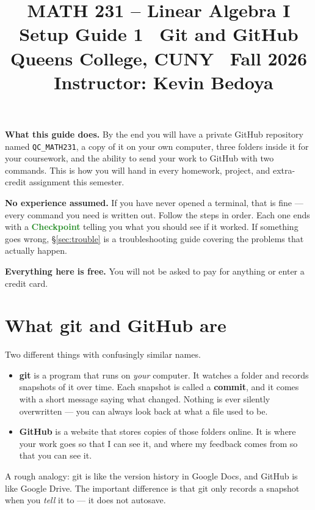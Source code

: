 \documentclass[11pt]{article}
\title{\vspace{-1.2cm}\textbf{\sffamily MATH 231 -- Linear Algebra I}\\[4pt]
       {\large\sffamily Setup Guide 1 \textbullet\ Git and GitHub}\\[2pt]
       {\normalsize\sffamily Queens College, CUNY \textbullet\ Fall 2026
        \textbullet\ Instructor: Kevin Bedoya}}
\author{}
\date{}
\newcommand{\repname}{QC\_MATH231}
\begin{document}
\maketitle
\vspace{-1.4cm}

\noindent\textbf{What this guide does.} By the end you will have a private
GitHub repository named \texttt{\repname}, a copy of it on your own computer,
three folders inside it for your coursework, and the ability to send your work
to GitHub with two commands. This is how you will hand in every homework,
project, and extra-credit assignment this semester.

\medskip
\noindent\textbf{No experience assumed.} If you have never opened a terminal,
that is fine --- every command you need is written out. Follow the steps in
order. Each one ends with a \textcolor{ForestGreen}{\sffamily\bfseries
Checkpoint} telling you what you should see if it worked. If something goes
wrong, \S\ref{sec:trouble} is a troubleshooting guide covering the problems that
actually happen.

\medskip
\noindent\textbf{Everything here is free.} You will not be asked to pay for
anything or enter a credit card.

\section{What git and GitHub are}
Two different things with confusingly similar names.

\begin{itemize}[leftmargin=1.4em,itemsep=5pt]
  \item \textbf{git} is a program that runs on \emph{your} computer. It watches
        a folder and records snapshots of it over time. Each snapshot is called
        a \textbf{commit}, and it comes with a short message saying what
        changed. Nothing is ever silently overwritten --- you can always look
        back at what a file used to be.
  \item \textbf{GitHub} is a website that stores copies of those folders online.
        It is where your work goes so that I can see it, and where my feedback
        comes from so that you can see it.
\end{itemize}

\noindent A rough analogy: git is like the version history in Google Docs, and
GitHub is like Google Drive. The important difference is that git only records a
snapshot when you \emph{tell} it to --- it does not autosave.
\end{document}

